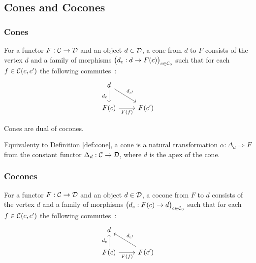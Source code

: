 \subsection{Cones and Cocones}

\subsubsection*{Cones}

\begin{definition}
	For a functor $F:\mathcal{C}\to \mathcal{D}$ and an object $d\in \mathcal{D}$, a cone from $d$ to $F$
	consists of the vertex $d$ and a family of morphisms $\big(d_c: d \to
	F(c)\big)_{c\in \mathcal{C}_0}$ such that for each $f\in \mathcal{C}(c, c')$ the following
	commutes~\parencite[p.~118]{leinster:basic_category_theory}:
	\[\begin{tikzcd}
		d \\
		{F(c)} & {F(c')}
		\arrow["{d_{c'}}", from=1-1, to=2-2]
		\arrow["{d_c}"', from=1-1, to=2-1]
		\arrow["{F(f)}"', from=2-1, to=2-2]
	\end{tikzcd}\]
\end{definition}

\begin{remark}
	Cones are dual of cocones.
\end{remark}

\begin{definition}
	Equivalenty to Definition \ref{def:cone}, a cone is a natural transformation
	$\alpha: \Delta_d \Rightarrow F$ from the constant functor $\Delta_d:\mathcal{C}\to
	\mathcal{D}$, where $d$ is the apex of the cone.
\end{definition}

\subsubsection*{Cocones}
\begin{definition}
	For a functor $F:\mathcal{C}\to \mathcal{D}$ and an object $d\in \mathcal{D}$, a cocone from $F$ to $d$
	consists of the vertex $d$ and a family of morphisms $\big(d_c: F(c) \to
	d\big)_{c\in \mathcal{C}_0}$ such that for each $f \in \mathcal{C}(c, c')$ the following
	commutes~\parencite[p.~126]{leinster:basic_category_theory}:
	\[\begin{tikzcd}[ampersand replacement=\&]
		d \\
		{F(c)} \& {F(c')}
		\arrow["{d_{c'}}"', from=2-2, to=1-1]
		\arrow["{d_c}", from=2-1, to=1-1]
		\arrow["{F(f)}"', from=2-1, to=2-2]
	\end{tikzcd}\]
\end{definition}

